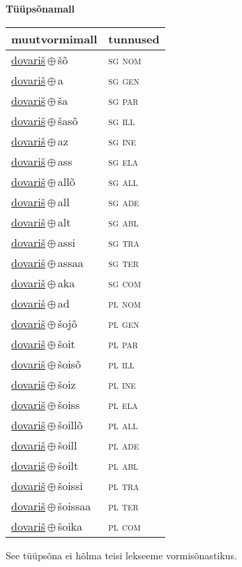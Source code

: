

\vspace{3.5em}
\noindent \begin{minipage}{\textwidth}
\noindent \textbf{Tüüpsõnamall \,}\\

\begin{sideways}
\begin{tabular}{l l}
muutvormimall & tunnused \\
\hline
\underline{dovariš}\,$\oplus$\,šõ & \textsc{ sg nom } \\
\underline{dovariš}\,$\oplus$\,a & \textsc{ sg gen } \\
\underline{dovariš}\,$\oplus$\,ša & \textsc{ sg par } \\
\underline{dovariš}\,$\oplus$\,šasõ & \textsc{ sg ill } \\
\underline{dovariš}\,$\oplus$\,az & \textsc{ sg ine } \\
\underline{dovariš}\,$\oplus$\,ass & \textsc{ sg ela } \\
\underline{dovariš}\,$\oplus$\,allõ & \textsc{ sg all } \\
\underline{dovariš}\,$\oplus$\,all & \textsc{ sg ade } \\
\underline{dovariš}\,$\oplus$\,alt & \textsc{ sg abl } \\
\underline{dovariš}\,$\oplus$\,assi & \textsc{ sg tra } \\
\underline{dovariš}\,$\oplus$\,assaa & \textsc{ sg ter } \\
\underline{dovariš}\,$\oplus$\,aka & \textsc{ sg com } \\
\underline{dovariš}\,$\oplus$\,ad & \textsc{ pl nom } \\
\underline{dovariš}\,$\oplus$\,šojõ & \textsc{ pl gen } \\
\underline{dovariš}\,$\oplus$\,šoit & \textsc{ pl par } \\
\underline{dovariš}\,$\oplus$\,šoisõ & \textsc{ pl ill } \\
\underline{dovariš}\,$\oplus$\,šoiz & \textsc{ pl ine } \\
\underline{dovariš}\,$\oplus$\,šoiss & \textsc{ pl ela } \\
\underline{dovariš}\,$\oplus$\,šoillõ & \textsc{ pl all } \\
\underline{dovariš}\,$\oplus$\,šoill & \textsc{ pl ade } \\
\underline{dovariš}\,$\oplus$\,šoilt & \textsc{ pl abl } \\
\underline{dovariš}\,$\oplus$\,šoissi & \textsc{ pl tra } \\
\underline{dovariš}\,$\oplus$\,šoissaa & \textsc{ pl ter } \\
\underline{dovariš}\,$\oplus$\,šoika & \textsc{ pl com } \\
\end{tabular}
\end{sideways}
\label{tab:tüüpsõnamall-dovariššõ}

\end{minipage}

 
\vspace{1em}
\noindent See tüüpsõna ei hõlma teisi lekseeme vormi\-sõnastikus.
